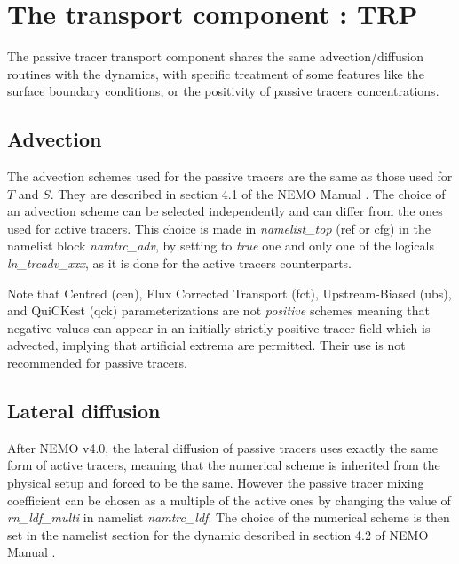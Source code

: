 \documentclass[../main/TOP_manual]{subfiles}
\begin{document}
\section{The transport component : TRP}

The passive tracer transport component shares the same advection/diffusion routines with the dynamics, with specific treatment of some features like the surface boundary conditions, or the positivity of passive tracers concentrations.

\subsection{Advection}

The advection schemes used for the passive tracers are the same as those used for $T$ and $S$. They are described in section 4.1 of the NEMO Manual \citep{nemo_manual}.
The choice of an advection scheme can be selected independently and can differ from the ones used for active tracers.
This choice is made in \textit{namelist\_top} (ref or cfg) in the namelist block \textit{namtrc\_adv}, by setting to \textit{true} one and only one of the logicals \textit{ln\_trcadv\_xxx}, as it is done for the active tracers counterparts.

Note that Centred (cen), Flux Corrected Transport (fct), Upstream-Biased (ubs), and QuiCKest (qck) parameterizations are not \textit{positive} schemes meaning that negative values can appear in an initially strictly positive tracer field which is advected, implying that artificial extrema are permitted. Their use is not recommended for passive tracers.


\subsection{Lateral diffusion}

After NEMO v4.0, the lateral diffusion of passive tracers uses exactly the same form of active tracers, meaning that the numerical scheme is inherited from the physical setup and forced to be the same.
However the passive tracer mixing coefficient can be chosen as a multiple of the active ones by changing the value of \textit{rn\_ldf\_multi} in namelist \textit{namtrc\_ldf}.
The choice of the numerical scheme is then set in the  namelist section for the dynamic described in section 4.2 of NEMO Manual \citep{nemo_manual}.
\end{document}
